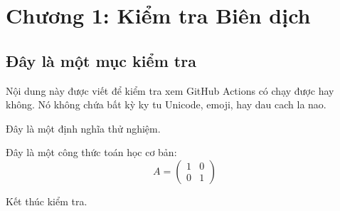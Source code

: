 
\chapter{Chương 1: Kiểm tra Biên dịch}

\section{Đây là một mục kiểm tra}

Nội dung này được viết để kiểm tra xem GitHub Actions
có chạy được hay không. Nó không chứa bất kỳ 
ky tu Unicode, emoji, hay dau cach la nao.

\begin{dinhnghia}
Đây là một định nghĩa thử nghiệm.
\end{dinhnghia}

Đây là một công thức toán học cơ bản:
\[
A = \begin{pmatrix} 1 & 0 \\ 0 & 1 \end{pmatrix}
\]

Kết thúc kiểm tra.
